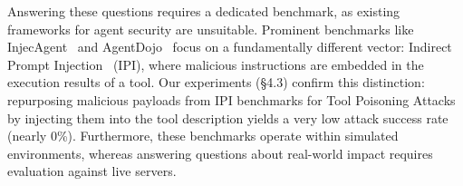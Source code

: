 Answering these questions requires a dedicated benchmark, as existing frameworks for agent security are unsuitable. Prominent benchmarks like InjecAgent~\cite{zhan2024injecagentbenchmarkingindirectprompt} and AgentDojo~\cite{debenedetti2024agentdojodynamicenvironmentevaluate} focus on a fundamentally different vector: Indirect Prompt Injection~\cite{greshake2023youvesignedforcompromising,esmradi2023comprehensivesurveyattacktechniques,liu2024promptinjectionattackllmintegrated} (IPI), where malicious instructions are embedded in the execution results of a tool. Our experiments (§4.3) confirm this distinction: repurposing malicious payloads from IPI benchmarks for Tool Poisoning Attacks by injecting them into the tool description yields a very low attack success rate (nearly 0\%). Furthermore, these benchmarks operate within simulated environments, whereas answering questions about real-world impact requires evaluation against live servers.



